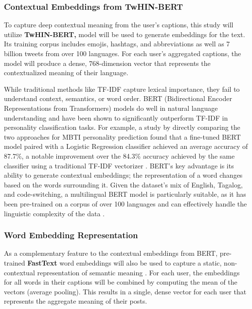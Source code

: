 \subsubsection{Contextual Embeddings from TwHIN-BERT}
To capture deep contextual meaning from the user's captions, this study will utilize \textbf{TwHIN-BERT,} model will be used to generate embeddings for the text. Its training corpus includes emojis, hashtags, and abbreviations as well as 7 billion tweets from over 100 languages. For each user's aggregated captions, the model will produce a dense, 768-dimension vector that represents the contextualized meaning of their language.

While traditional methods like TF-IDF capture lexical importance, they fail to understand context, semantics, or word order. BERT (Bidirectional Encoder Representations from Transformers) models do well in natural language understanding and have been shown to significantly outperform TF-IDF in personality classification tasks. For example, a study by \citep{zhang2023} directly comparing the two approaches for MBTI personality prediction found that a fine-tuned BERT model paired with a Logistic Regression classifier achieved an average accuracy of 87.7\%, a notable improvement over the 84.3\% accuracy achieved by the same classifier using a traditional TF-IDF vectorizer \citep{zhang2023}. BERT's key advantage is its ability to generate contextual embeddings; the representation of a word changes based on the words surrounding it. Given the dataset's mix of English, Tagalog, and code-switching, a multilingual BERT model is particularly suitable, as it has been pre-trained on a corpus of over 100 languages and can effectively handle the linguistic complexity of the data \citep{devlin2018bert, cruz2022roberta}.

\subsubsection{Word Embedding Representation}
As a complementary feature to the contextual embeddings from BERT, pre-trained \textbf{FastText} word embeddings will also be used to capture a static, non-contextual representation of semantic meaning \citep{grave2018}. For each user, the embeddings for all words in their captions will be combined by computing the mean of the vectors (average pooling). This results in a single, dense vector for each user that represents the aggregate meaning of their posts.

